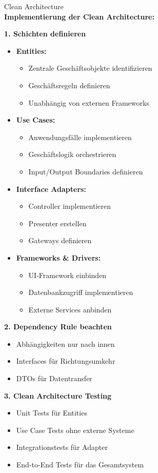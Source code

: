 \begin{KR}{Clean Architecture}\\
\textbf{Implementierung der Clean Architecture:}

\textbf{1. Schichten definieren}
\begin{itemize}
    \item \textbf{Entities:}
    \begin{itemize}
        \item Zentrale Geschäftsobjekte identifizieren
        \item Geschäftsregeln definieren
        \item Unabhängig von externen Frameworks
    \end{itemize}
    
    \item \textbf{Use Cases:}
    \begin{itemize}
        \item Anwendungsfälle implementieren
        \item Geschäftslogik orchestrieren
        \item Input/Output Boundaries definieren
    \end{itemize}
    
    \item \textbf{Interface Adapters:}
    \begin{itemize}
        \item Controller implementieren
        \item Presenter erstellen
        \item Gateways definieren
    \end{itemize}
    
    \item \textbf{Frameworks \& Drivers:}
    \begin{itemize}
        \item UI-Framework einbinden
        \item Datenbankzugriff implementieren
        \item Externe Services anbinden
    \end{itemize}
\end{itemize}

\textbf{2. Dependency Rule beachten}
\begin{itemize}
    \item Abhängigkeiten nur nach innen
    \item Interfaces für Richtungsumkehr
    \item DTOs für Datentransfer
\end{itemize}

\textbf{3. Clean Architecture Testing}
\begin{itemize}
    \item Unit Tests für Entities
    \item Use Case Tests ohne externe Systeme
    \item Integrationstests für Adapter
    \item End-to-End Tests für das Gesamtsystem
\end{itemize}
\end{KR}

